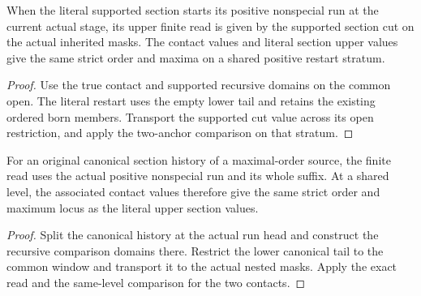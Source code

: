 \begin{theorem}
\label{hir:g1-later-literal-section-restart}
\leanok
When the literal supported section starts its positive
nonspecial run at the current actual stage, its upper finite
read is given by the supported section cut on the actual
inherited masks. The contact values and literal section upper
values give the same strict order and maxima on a shared
positive restart stratum.
\end{theorem}
\begin{proof}
Use the true contact and supported recursive domains on the
common open. The literal restart uses the empty lower tail
and retains the existing ordered born members. Transport
the supported cut value across its open restriction, and
apply the two-anchor comparison on that stratum.
\end{proof}

\begin{theorem}
\label{hir:g1-later-literal-section-canonical-tail}
\leanok
For an original canonical section history of a maximal-order
source, the finite read uses the actual positive nonspecial
run and its whole suffix. At a shared level, the associated
contact values therefore give the same strict order and
maximum locus as the literal upper section values.
\end{theorem}
\begin{proof}
Split the canonical history at the actual run head and
construct the recursive comparison domains there. Restrict
the lower canonical tail to the common window and transport
it to the actual nested masks. Apply the exact read and the
same-level comparison for the two contacts.
\end{proof}

